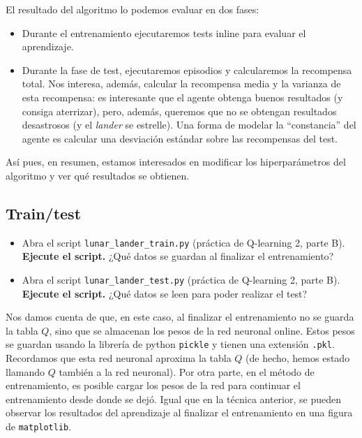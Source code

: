 \documentclass{article}
\begin{document}
El resultado del algoritmo lo podemos evaluar en dos fases:
\begin{itemize}
    \item Durante el entrenamiento ejecutaremos tests inline para evaluar el aprendizaje. 
    \item Durante la fase de test, ejecutaremos episodios y calcularemos la recompensa total. Nos interesa, además, calcular la recompensa media y la varianza de esta recompensa: es interesante que el agente obtenga buenos resultados (y consiga aterrizar), pero, además, queremos que no se obtengan resultados desastrosos (y el \textit{lander} se estrelle). Una forma de modelar la ``constancia'' del agente es calcular una desviación estándar sobre las recompensas del test.
\end{itemize}

Así pues, en resumen, estamos interesados en modificar los hiperparámetros del algoritmo y ver qué resultados se obtienen.

\subsection{Train/test}


\begin{exercise}
\begin{itemize}
\item Abra el script \texttt{lunar\_lander\_train.py} (práctica de Q-learning 2, parte B). \textbf{Ejecute el script.} ¿Qué datos se guardan al finalizar el entrenamiento?
\item Abra el script \texttt{lunar\_lander\_test.py} (práctica de Q-learning 2, parte B). \textbf{Ejecute el script.} ¿Qué datos se leen para poder realizar el test?
\end{itemize}
\end{exercise}

Nos damos cuenta de que, en este caso, al finalizar el entrenamiento no se guarda la tabla $Q$, sino que se almacenan los pesos de la red neuronal online. Estos pesos se guardan usando la librería de python \texttt{pickle} y tienen una extensión \texttt{.pkl}. Recordamos que esta red neuronal aproxima la tabla $Q$ (de hecho, hemos estado llamando $Q$ también a la red neuronal). Por otra parte, en el método de entrenamiento, es posible cargar los pesos de la red para continuar el entrenamiento desde donde se dejó. Igual que en la técnica anterior, se pueden observar los resultados del aprendizaje al finalizar el entrenamiento en una figura de \texttt{matplotlib}. 
\end{document}
